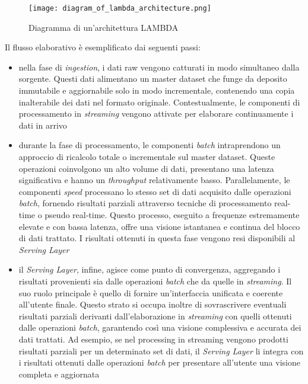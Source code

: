 \begin{figure}[h]
    \centering
    \texttt{[image: diagram\_of\_lambda\_architecture.png]}
    \caption[Architettura LAMBDA]{Diagramma di un'architettura LAMBDA \cite{lambdaArchitecture}}
\end{figure}

Il flusso elaborativo è esemplificato dai seguenti passi:
\begin{itemize}
    \item nella fase di \textit{ingestion}, i dati raw vengono catturati in modo simultaneo dalla sorgente. Questi dati alimentano un master dataset che funge da deposito immutabile e aggiornabile solo in modo incrementale, contenendo una copia inalterabile dei dati nel formato originale. Contestualmente, le componenti di processamento in \textit{streaming} vengono attivate per elaborare continuamente i dati in arrivo
    \item durante la fase di processamento, le componenti \textit{batch} intraprendono un approccio di ricalcolo totale o incrementale sul master dataset. Queste operazioni coinvolgono un alto volume di dati, presentano una latenza significativa e hanno un \textit{throughput} relativamente basso. Parallelamente, le componenti \textit{speed} processano lo stesso set di dati acquisito dalle operazioni \textit{batch}, fornendo risultati parziali attraverso tecniche di processamento real-time o pseudo real-time. Questo processo, eseguito a frequenze estremamente elevate e con bassa latenza, offre una visione istantanea e continua del blocco di dati trattato. I risultati ottenuti in questa fase vengono resi disponibili al \textit{Serving Layer}
    \item il \textit{Serving Layer}, infine, agisce come punto di convergenza, aggregando i risultati provenienti sia dalle operazioni \textit{batch} che da quelle in \textit{streaming}. Il suo ruolo principale è quello di fornire un'interfaccia unificata e coerente all'utente finale. Questo strato si occupa inoltre di sovrascrivere eventuali risultati parziali derivanti dall'elaborazione in \textit{streaming} con quelli ottenuti dalle operazioni \textit{batch}, garantendo così una visione complessiva e accurata dei dati trattati. Ad esempio, se nel processing in streaming vengono prodotti risultati parziali per un determinato set di dati, il \textit{Serving Layer} li integra con i risultati ottenuti dalle operazioni \textit{batch} per presentare all'utente una visione completa e aggiornata
\end{itemize}

